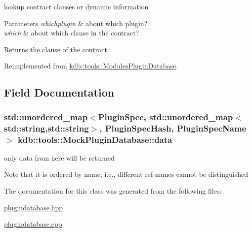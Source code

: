lookup contract clauses or dynamic information 


\begin{DoxyParams}{Parameters}
{\em whichplugin} & about which plugin? \\
\hline
{\em which} & about which clause in the contract?\\
\hline
\end{DoxyParams}
\begin{DoxyReturn}{Returns}
the clause of the contract 
\end{DoxyReturn}


Reimplemented from \hyperlink{classkdb_1_1tools_1_1ModulesPluginDatabase_a3d06a4b33e4bcc879dd6f562a8876390}{kdb\+::tools\+::\+Modules\+Plugin\+Database}.



\subsection{Field Documentation}
\hypertarget{classkdb_1_1tools_1_1MockPluginDatabase_ada123c0b3f854802195670ec7d908fc1}{
\subsubsection[{data}]{\setlength{\rightskip}{0pt plus 5cm}std\+::unordered\+\_\+map$<${\bf Plugin\+Spec}, std\+::unordered\+\_\+map$<$std\+::string,std\+::string$>$, {\bf Plugin\+Spec\+Hash}, Plugin\+Spec\+Name$>$ kdb\+::tools\+::\+Mock\+Plugin\+Database\+::data\hspace{0.3cm}{\ttfamily [mutable]}}}\label{classkdb_1_1tools_1_1MockPluginDatabase_ada123c0b3f854802195670ec7d908fc1}


only data from here will be returned 

\begin{DoxyNote}{Note}
that it is ordered by name, i.\+e., different ref-\/names cannot be distinguished 
\end{DoxyNote}


The documentation for this class was generated from the following files\+:\begin{DoxyCompactItemize}
\item 
\hyperlink{plugindatabase_8hpp}{plugindatabase.\+hpp}\item 
\hyperlink{plugindatabase_8cpp}{plugindatabase.\+cpp}\end{DoxyCompactItemize}
